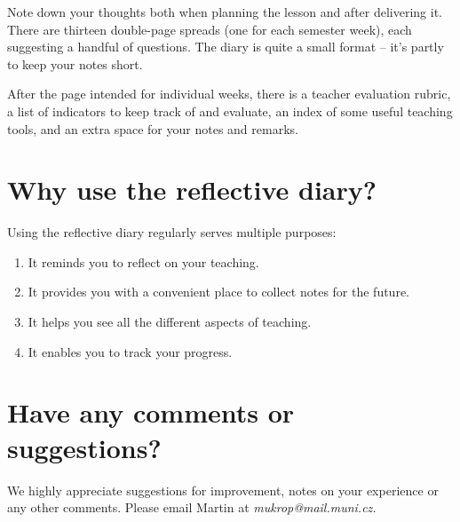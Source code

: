 Note down your thoughts both when planning the lesson and after delivering it. There are thirteen double-page spreads (one for each semester week), each suggesting a handful of questions. The diary is quite a small format -- it's partly to keep your notes short.

After the page intended for individual weeks, there is a teacher evaluation rubric, a list of indicators to keep track of and evaluate, an index of some useful teaching tools, and an extra space for your notes and remarks.

\section*{Why use the reflective diary?}

Using the reflective diary regularly serves multiple purposes:
\begin{enumerate}[topsep=0pt]
\item It reminds you to reflect on your teaching.
\item It provides you with a convenient place to collect notes for the future.
\item It helps you see all the different aspects of teaching.
\item It enables you to track your progress.
\end{enumerate}

\section*{Have any comments or suggestions?}

We highly appreciate suggestions for improvement, notes on your experience or any other comments. Please email Martin at \textit{mukrop@mail.muni.cz.}
